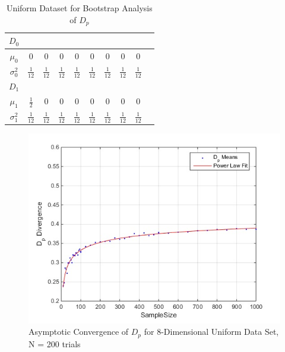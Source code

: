 \documentclass{article}
\begin{document}
	
	\begin{table}[ht]
		\caption{Uniform Dataset for Bootstrap Analysis of $D_p$}
		\centering %
		\begin{tabular}{c c c c c c c c c c} %
			$D_0$ &  &  &  \\ [0.5ex] %
			\hline %
			$\mu_0$ & 0 & 0 & 0 & 0 & 0 & 0 & 0 & 0\\[0.5ex] %
			$\sigma_0^2$ & \( \frac{1}{12} \) & \( \frac{1}{12} \) & \( \frac{1}{12} \) & \( \frac{1}{12} \) & \( \frac{1}{12} \) & \( \frac{1}{12} \) & \( \frac{1}{12} \) & \( \frac{1}{12} \) &  \\[2ex]
			
			$D_1$ & \\ [0.5ex]
			
			\hline
			$\mu_1$ & \( \frac{1}{2} \) & 0 & 0 & 0 & 0 & 0 & 0 & 0\\[0.5ex] %
			$\sigma_1^2$ & \( \frac{1}{12} \) & \( \frac{1}{12} \) & \( \frac{1}{12} \) & \( \frac{1}{12} \) & \( \frac{1}{12} \) & \( \frac{1}{12} \) & \( \frac{1}{12} \) & \( \frac{1}{12} \) &  \\ [1ex] %
			\hline %
		\end{tabular}
		\label{table:nonlin} %
	\end{table}
	
	\begin{figure}[h!]
		\caption{Asymptotic Convergence of $D_p$ for 8-Dimensional Uniform Data Set, N = 200 trials}
		\centering
		\includegraphics[scale=0.6]{dp_n200_uniform}
	\end{figure}	
	
\end{document}
